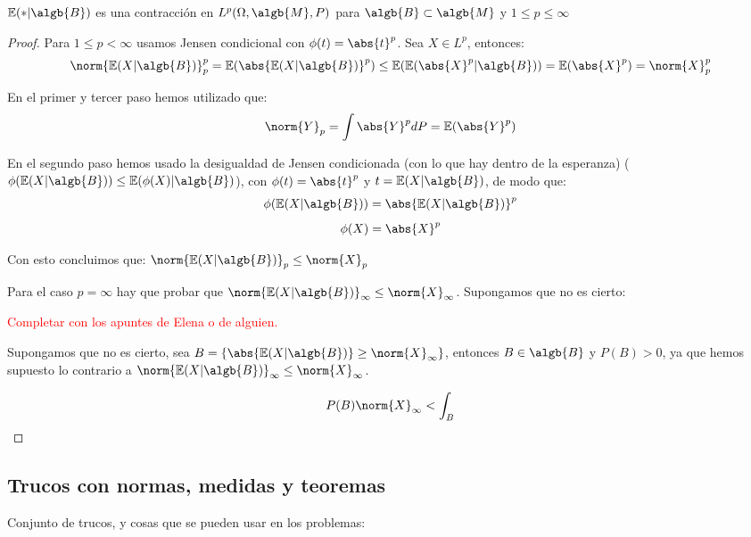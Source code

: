\documentclass{apuntes}
\begin{document}
\begin{theorem}
$\mathbb{E}(*|\algb{B})$ es una contracción en $L^p(\Omega, \algb{M}, P)$ para $\algb{B}\subset\algb{M}$ y $1\leq p\leq\infty$
\end{theorem}
\begin{proof}
Para $1\leq p < \infty$ usamos Jensen condicional con $\phi(t)=\abs{t}^p$. Sea $X \in L^p$, entonces:
\[
\norm{\mathbb{E}(X|\algb{B})}_p^p = \mathbb{E}(\abs{\mathbb{E}(X|\algb{B})}^p) \leq  \mathbb{E}(\mathbb{E}(\abs{X}^p|\algb{B})) = \mathbb{E}(\abs{X}^p) = \norm{X}_p^p
\]

En el primer y tercer paso hemos utilizado que:
\[
\norm{Y}_p = \int \abs{Y}^pdP =\mathbb{E}(\abs{Y}^p)
\]

En el segundo paso hemos usado la desigualdad de Jensen condicionada (con lo que hay dentro de la esperanza) ($\phi(\mathbb{E}(X|\algb{B})) \leq \mathbb{E}(\phi(X)|\algb{B})$), con $\phi(t)=\abs{t}^p$ y $t=\mathbb{E}(X|\algb{B})$, de modo que:
\[
\phi(\mathbb{E}(X|\algb{B})) = \abs{\mathbb{E}(X|\algb{B})}^p
\]
\[
\phi(X) = \abs{X}^p 
\]

Con esto concluimos que: $\norm{\mathbb{E}(X|\algb{B})}_p \leq \norm{X}_p$

Para el caso $p=\infty$ hay que probar que $\norm{\mathbb{E}(X|\algb{B})}_{\infty} \leq \norm{X}_{\infty}$. Supongamos que no es cierto:


\textcolor{red}{Completar con los apuntes de Elena o de alguien.}

Supongamos que no es cierto, sea $B=\{\abs{\mathbb{E}(X|\algb{B})}\geq\norm{X}_{\infty}\}$, entonces $B \in \algb{B}$ y $P(B) > 0$, ya que hemos supuesto lo contrario a $\norm{\mathbb{E}(X|\algb{B})}_{\infty} \leq \norm{X}_{\infty}$.

\[
P(B)\norm{X}_{\infty} < \int_B
\]
\end{proof}





\subsection{Trucos con normas, medidas y teoremas}

Conjunto de trucos, y cosas que se pueden usar en los problemas:
\end{document}
